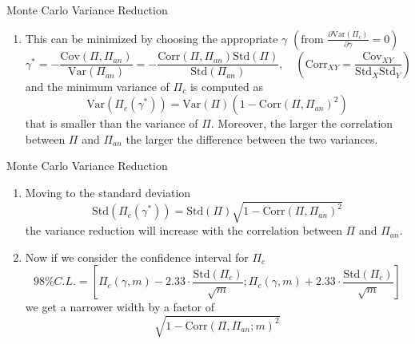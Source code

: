 \documentclass{beamer}
\begin{document}
\begin{frame}{Monte Carlo Variance Reduction}
	\begin{enumerate}\addtocounter{enumi}{2}
		\item This can be minimized by choosing the appropriate $\gamma$ $\left(\text{from }\frac{\partial \text{Var}(\Pi_c)}{\partial\gamma}=0\right)$
		\begin{equation*}
			\gamma^* = -\frac{\text{Cov}(\Pi, \Pi_{an})}{\text{Var}(\Pi_{an})} = -\frac{\text{Corr}(\Pi, \Pi_{an})\text{Std}(\Pi)}{\text{Std}(\Pi_{an})}, \quad \left(\text{Corr}_{XY}=\frac{\text{Cov}_{XY}}{\text{Std}_X \text{Std}_Y}\right)
		\end{equation*}
		and the minimum variance of $\Pi_c$ is computed as
		\begin{equation*}
			\text{Var}(\Pi_c(\gamma^*)) = \text{Var}(\Pi)(1 - \text{Corr}(\Pi, \Pi_{an})^2)
		\end{equation*}
		that is \textcolor{maincolor}{smaller than the variance of $\Pi$}. Moreover, the \textcolor{maincolor}{larger the correlation between $\Pi$ and $\Pi_{an}$ the larger the difference between the two variances}.
	\end{enumerate}
\end{frame}

\begin{frame}{Monte Carlo Variance Reduction}
	\begin{enumerate}\addtocounter{enumi}{3}
		\item<1-> Moving to the standard deviation
		\begin{equation*}
			\text{Std}(\Pi_c(\gamma^*)) = \text{Std}(\Pi) \sqrt{1 - \text{Corr}(\Pi, \Pi_{an})^2}
		\end{equation*}
		the variance reduction will increase with the correlation between $\Pi$ and $\Pi_{an}$.
		\item<2-> Now if we consider the confidence interval for $\Pi_c$
		\begin{equation*}
			98\% C.L. =\left[\Pi_c(\gamma,m) - 2.33\cdot\frac{\text{Std}(\Pi_c)}{\sqrt{m}};\Pi_c(\gamma,m) + 2.33\cdot\frac{\text{Std}(\Pi_c)}{\sqrt{m}}\right]
		\end{equation*}
		we get a narrower width by a factor of
		\begin{equation*}
			\sqrt{1 - \text{Corr}(\Pi, \Pi_{an}; m)^2}
		\end{equation*}
	\end{enumerate}
\end{frame}
\end{document}
